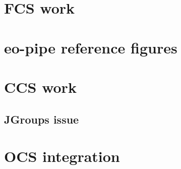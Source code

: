 \appendix

\section{FCS work}

\section{eo-pipe reference figures}

\section{CCS work}
\subsection{JGroups issue}

\section{OCS integration}




